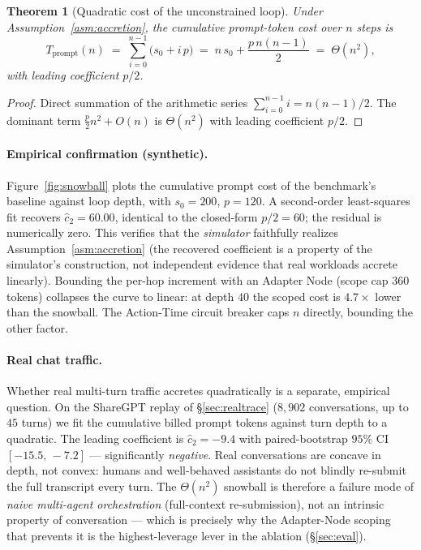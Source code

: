 \documentclass[11pt]{article}
\theoremstyle{plain}
\newtheorem{theorem}{Theorem}
\theoremstyle{definition}
\theoremstyle{remark}
\begin{document}
\begin{theorem}[Quadratic cost of the unconstrained loop]\label{thm:quad}
Under Assumption~\ref{asm:accretion}, the cumulative prompt-token cost over $n$ steps is
\begin{equation}
T_{\mathrm{prompt}}(n) \;=\; \sum_{i=0}^{n-1}\big(s_0 + i\,p\big) \;=\; n\,s_0 + \frac{p\,n(n-1)}{2} \;=\; \Theta(n^2),
\end{equation}
with leading coefficient $p/2$.
\end{theorem}

\begin{proof}
Direct summation of the arithmetic series $\sum_{i=0}^{n-1} i = n(n-1)/2$. The dominant term $\tfrac{p}{2}n^2 + O(n)$ is $\Theta(n^2)$ with leading coefficient $p/2$.
\end{proof}

\paragraph{Empirical confirmation (synthetic).}\label{sec:snowball-fit} Figure~\ref{fig:snowball} plots the cumulative prompt cost of the benchmark's baseline against loop depth, with $s_0=200$, $p=120$. A second-order least-squares fit recovers $\hat c_2 = 60.00$, identical to the closed-form $p/2 = 60$; the residual is numerically zero. This verifies that the \emph{simulator} faithfully realizes Assumption~\ref{asm:accretion} (the recovered coefficient is a property of the simulator's construction, not independent evidence that real workloads accrete linearly). Bounding the per-hop increment with an Adapter Node (scope cap $360$ tokens) collapses the curve to linear: at depth $40$ the scoped cost is $4.7\times$ lower than the snowball. The Action-Time circuit breaker caps $n$ directly, bounding the other factor.

\paragraph{Real chat traffic.} Whether real multi-turn traffic accretes quadratically is a separate, empirical question. On the ShareGPT replay of \S\ref{sec:realtrace} ($8{,}902$ conversations, up to $45$ turns) we fit the cumulative billed prompt tokens against turn depth to a quadratic. The leading coefficient is $\hat c_2 = -9.4$ with paired-bootstrap $95\%$ CI $[-15.5,\,-7.2]$ --- significantly \emph{negative}. Real conversations are concave in depth, not convex: humans and well-behaved assistants do not blindly re-submit the full transcript every turn. The $\Theta(n^2)$ snowball is therefore a failure mode of \emph{naive multi-agent orchestration} (full-context re-submission), not an intrinsic property of conversation --- which is precisely why the Adapter-Node scoping that prevents it is the highest-leverage lever in the ablation (\S\ref{sec:eval}).
\end{document}
